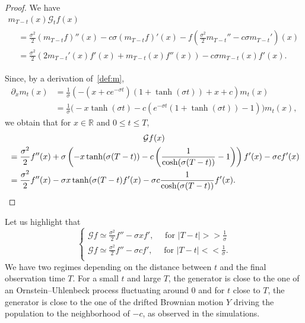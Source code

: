 \documentclass[10pt]{amsart}
\theoremstyle{definition}\newtheorem{defi}[theo]{Definition}\newtheorem{rema}[theo]{Remark}\newtheorem{exam}[theo]{Example}\newtheorem{exem}[theo]{Example}\newtheorem{nota}[theo]{Notation}
\newcommand{\Go}{\mathcal{G}}
\newcommand*\R{\mathbb{R}}
\begin{document}
\begin{proof}
We have
\begin{multline*}
m_{T-t}(x) \Go_{t}f(x)\\
\begin{aligned}
&= \frac{\sigma^2}{2} \left(m_{T-t} f\right)''(x) - c \sigma \left(m_{T-t} f\right)'(x) - f \left(\frac{\sigma^2}{2}m_{T-t}'' - c \sigma m_{T-t} ' \right)(x)\\
&= \frac{\sigma^2}{2} \left(2 m_{T-t}'(x) f'(x) + m_{T-t}(x) f''(x) \right)- c \sigma m_{T-t}(x) f'(x).
\end{aligned}
\end{multline*}

Since, by a derivation of~\eqref{def:m},
\begin{align*}
\partial_{x}m_{t}(x)
&=\frac{1}{\sigma}\left(-\left(x +c e^{-\sigma t}\right)(1+\tanh(\sigma t))+ x+c\right)m_{t}(x)\\
&=\frac{1}{\sigma}\Big(- x\tanh(\sigma t)-c\left(e^{-\sigma t}(1+\tanh(\sigma t))-1 \right)\Big)m_{t}(x),
\end{align*}
we obtain that for $x\in \R$ and $0\le t\le T$,
\begin{multline*}
\Go f(x)\\
\begin{aligned}
&=\frac{\sigma^2}{2}f''(x)+\sigma\left(- x\tanh(\sigma (T-t))- c \left(\frac{1}{\cosh(\sigma (T-t))} - 1\right)\right)f'(x)-\sigma cf'(x)\\
&=\frac{\sigma^2}{2}f''(x)- \sigma x\tanh(\sigma (T-t)f'(x) - \sigma c \frac{1}{\cosh(\sigma (T-t))}f'(x).\qedhere
\end{aligned}
\end{multline*}
\end{proof}

Let us highlight that
\[
\begin{cases}
\Go f\simeq
\frac{\sigma^2}{2}f''-\sigma xf', \quad \text{ for } |T-t|>>\frac{1}{\sigma}\\
\Go f\simeq
\frac{\sigma^2}{2}f''-\sigma cf', \quad \text{ for } |T-t|<<\frac{1}{\sigma}.\\
\end{cases}
\]
We have two regimes depending on the distance between $t$ and the final observation time $T$. For a small $t$ and large $T$, the generator is close to the one of an Ornstein--Uhlenbeck process fluctuating around $0$ and for $t$ close to $T$, the generator is close to the one of the drifted Brownian motion $Y$ driving the population to the neighborhood of $-c$, as observed in the simulations.
\end{document}
